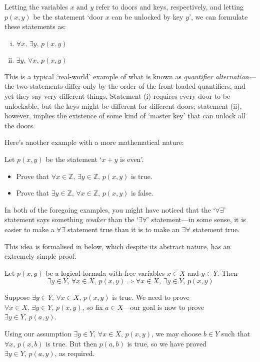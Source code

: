 Letting the variables $x$ and $y$ refer to doors and keys, respectively, and letting $p(x,y)$ be the statement `door $x$ can be unlocked by key $y$', we can formulate these statements as:
\begin{enumerate}[(i)] 
\item $\forall x,\, \exists y,\, p(x,y)$
\item $\exists y,\, \forall x,\, p(x,y)$
\end{enumerate}

This is a typical `real-world' example of what is known as \textit{quantifier alternation}---the two statements differ only by the order of the front-loaded quantifiers, and yet they say very different things. Statement (i) requires every door to be unlockable, but the keys might be different for different doors; statement (ii), however, implies the existence of some kind of `master key' that can unlock all the doors.

Here's another example with a more mathematical nature:

\begin{exercise}
Let $p(x,y)$ be the statement `$x + y$ is even'.
\begin{itemize}
\item Prove that $\forall x \in \mathbb{Z},\, \exists y \in \mathbb{Z},\, p(x,y)$ is true.
\item Prove that $\exists y \in \mathbb{Z},\, \forall x \in \mathbb{Z},\, p(x,y)$ is false.
\end{itemize}
\end{exercise}

In both of the foregoing examples, you might have noticed that the `$\forall\exists$' statement says something \textit{weaker} than the `$\exists\forall$' statement---in some sense, it is easier to make a $\forall\exists$ statement true than it is to make an $\exists\forall$ statement true.

This idea is formalised in  below, which despite its abstract nature, has an extremely simple proof.

\begin{theorem}
\label{thmQuantifierAlternation}
Let $p(x,y)$ be a logical formula with free variables $x \in X$ and $y \in Y$. Then
\[\exists y \in Y,\, \forall x \in X,\, p(x,y) \Rightarrow \forall x \in X,\, \exists y \in Y,\, p(x,y)\]
\end{theorem}

\begin{cproof}
Suppose $\exists y \in Y,\, \forall x \in X,\, p(x,y)$ is true. We need to prove $\forall x \in X,\, \exists y \in Y,\, p(x,y)$, so fix $a \in X$---our goal is now to prove $\exists y \in Y,\, p(a,y)$.

Using our assumption $\exists y \in Y,\, \forall x \in X,\, p(x,y)$, we may choose $b \in Y$ such that $\forall x,\, p(x,b)$ is true. But then $p(a, b)$ is true, so we have proved $\exists y \in Y,\, p(a,y)$, as required.
\end{cproof}

